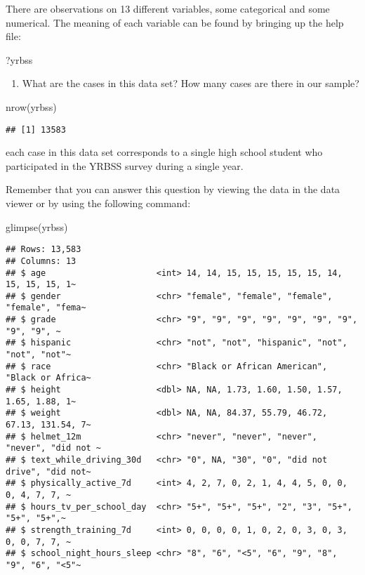 \documentclass[
]{article}
\newenvironment{Shaded}{\begin{snugshade}}{\end{snugshade}}
\newcommand{\FunctionTok}[1]{\textcolor[rgb]{0.00,0.00,0.00}{#1}}
\newcommand{\NormalTok}[1]{#1}
\providecommand{\tightlist}{%
  \setlength{\itemsep}{0pt}\setlength{\parskip}{0pt}}
\begin{document}
There are observations on 13 different variables, some categorical and
some numerical. The meaning of each variable can be found by bringing up
the help file:

\begin{Shaded}
\begin{Highlighting}[]
\NormalTok{?yrbss}
\end{Highlighting}
\end{Shaded}

\begin{enumerate}
\def\labelenumi{\arabic{enumi}.}
\tightlist
\item
  What are the cases in this data set? How many cases are there in our
  sample?
\end{enumerate}

\begin{Shaded}
\begin{Highlighting}[]
\FunctionTok{nrow}\NormalTok{(yrbss)}
\end{Highlighting}
\end{Shaded}

\begin{verbatim}
## [1] 13583
\end{verbatim}

each case in this data set corresponds to a single high school student
who participated in the YRBSS survey during a single year.

Remember that you can answer this question by viewing the data in the
data viewer or by using the following command:

\begin{Shaded}
\begin{Highlighting}[]
\FunctionTok{glimpse}\NormalTok{(yrbss)}
\end{Highlighting}
\end{Shaded}

\begin{verbatim}
## Rows: 13,583
## Columns: 13
## $ age                      <int> 14, 14, 15, 15, 15, 15, 15, 14, 15, 15, 15, 1~
## $ gender                   <chr> "female", "female", "female", "female", "fema~
## $ grade                    <chr> "9", "9", "9", "9", "9", "9", "9", "9", "9", ~
## $ hispanic                 <chr> "not", "not", "hispanic", "not", "not", "not"~
## $ race                     <chr> "Black or African American", "Black or Africa~
## $ height                   <dbl> NA, NA, 1.73, 1.60, 1.50, 1.57, 1.65, 1.88, 1~
## $ weight                   <dbl> NA, NA, 84.37, 55.79, 46.72, 67.13, 131.54, 7~
## $ helmet_12m               <chr> "never", "never", "never", "never", "did not ~
## $ text_while_driving_30d   <chr> "0", NA, "30", "0", "did not drive", "did not~
## $ physically_active_7d     <int> 4, 2, 7, 0, 2, 1, 4, 4, 5, 0, 0, 0, 4, 7, 7, ~
## $ hours_tv_per_school_day  <chr> "5+", "5+", "5+", "2", "3", "5+", "5+", "5+",~
## $ strength_training_7d     <int> 0, 0, 0, 0, 1, 0, 2, 0, 3, 0, 3, 0, 0, 7, 7, ~
## $ school_night_hours_sleep <chr> "8", "6", "<5", "6", "9", "8", "9", "6", "<5"~
\end{verbatim}
\end{document}
